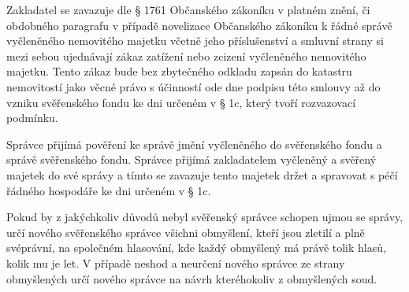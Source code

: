 \documentclass[parskip=half]{scrreprt}
\begin{document}
\begin{contract}

Zakladatel se zavazuje dle § 1761 Občanského zákoníku v platném znění, či obdobného paragrafu v případě novelizace Občanského zákoníku k řádné správě vyčleněného nemovitého majetku včetně jeho příslušenství a smluvní strany si mezi sebou ujednávají zákaz zatížení nebo zcizení vyčleněného nemovitého majetku. Tento zákaz bude bez zbytečného odkladu zapsán do katastru nemovitostí jako věcné právo s účinností ode dne podpisu této smlouvy až do vzniku svěřenského fondu ke dni určeném v § 1c, který tvoří rozvazovací podmínku.



Správce přijímá pověření ke správě jmění vyčleněného do svěřenského fondu a správě svěřenského fondu. Správce přijímá zakladatelem vyčleněný a svěřený majetek do své správy a tímto se zavazuje tento majetek držet a spravovat s péčí řádného hospodáře ke dni určeném v § 1c.

Pokud by z jakýchkoliv důvodů nebyl svěřenský správce schopen ujmou se správy, určí nového svěřenského správce všichni obmyšlení, kteří jsou zletilí a plně svéprávní, na společném hlasování, kde každý obmyšlený má právě tolik hlasů, kolik mu je let. V případě neshod a neurčení nového správce ze strany obmyšlených určí nového správce na návrh kteréhokoliv z obmyšlených soud.




\end{contract}
\end{document}
